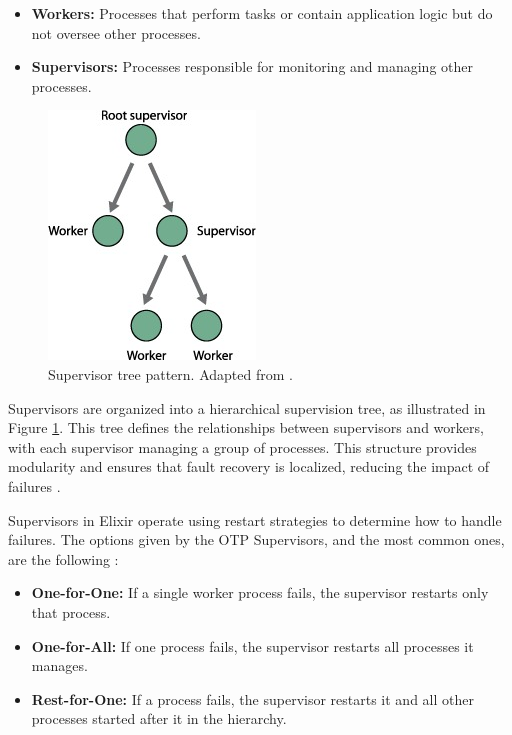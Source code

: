 \begin{itemize}
    \item \textbf{Workers:} Processes that perform tasks or contain application logic but do not oversee other processes.
    \item \textbf{Supervisors:} Processes responsible for monitoring and managing other processes.
\end{itemize}

\begin{figure}
    \centering
    \includegraphics[scale=0.7]{ch-state/assets/supervisor-design.jpg}
    \caption[Supervisor tree pattern]{Supervisor tree pattern. Adapted from \cite{Juric2024}.}
    \label{fig:supervisor-pattern}
\end{figure}

Supervisors are organized into a hierarchical supervision tree, as illustrated in Figure \ref{fig:supervisor-pattern}. This tree defines the relationships between supervisors and workers, with each supervisor managing a group of processes. This structure provides modularity and ensures that fault recovery is localized, reducing the impact of failures \cite{Armstrong2013}.

Supervisors in Elixir operate using restart strategies to determine how to handle failures. The options given by the \gls{OTP} Supervisors, and the most common ones, are the following \cite{elixir-docs-hexdocs,Juric2024,Armstrong2013}:
\begin{itemize}
    \item \textbf{One-for-One:} If a single worker process fails, the supervisor restarts only that process.
    \item \textbf{One-for-All:} If one process fails, the supervisor restarts all processes it manages.
    \item \textbf{Rest-for-One:} If a process fails, the supervisor restarts it and all other processes started after it in the hierarchy.
\end{itemize}

